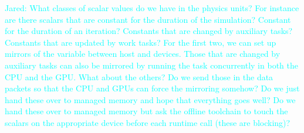 \documentclass{article}
\newcommand{\Jared}[1]          {\textcolor{cyan}{Jared: #1}}
\begin{document}
\Jared{What classes of scalar values do we have in the physics units?
For instance are there scalars that are constant for the duration of the
simulation?  Constant for the duration of an iteration?  Constants that are
changed by auxiliary tasks?  Constants that are updated by work tasks?  For the
first two, we can set up mirrors of the variable between host and devices.
Those that are changed by auxiliary tasks can also be mirrored by running the
task concurrently in both the CPU and the GPU.  What about the others?  Do we
send those in the data packets so that the CPU and GPUs can force the mirroring
somehow?  Do we just hand these over to managed memory and hope that everything
goes well?  Do we hand these over to managed memory but ask the offline
toolchain to touch the scalars on the appropriate device before each runtime
call (these are blocking)?}
\end{document}
